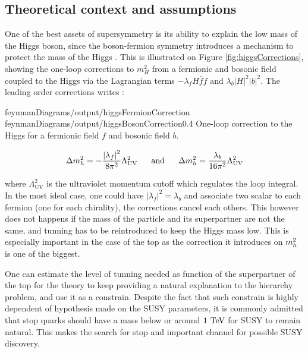         \subsection{Theoretical context and assumptions}

        One of the best assets of supersymmetry is its ability to explain the low mass
        of the Higgs boson, since the boson-fermion symmetry introduces a mechanism to
        protect the mass of the Higgs . This is illustrated on Figure
        \ref{fig:higgsCorrections}, showing the one-loop corrections to $m_H^2$
        from a fermionic and bosonic field coupled to the Higgs via the Lagrangian terms
        $- \lambda_f H \bar{f} f$ and $\lambda_b \left| H \right|^2 \left| b \right|^2$.
        The leading order corrections writes :

        {feynmanDiagrams/output/higgsFermionCorrection}
        {feynmanDiagrams/output/higgsBosonCorrection}{0.4}
        {One-loop correction to the Higgs for a fermionic field $f$ and bosonic field $b$.}

        \begin{equation}
            \Delta m_{h}^2 = - \frac{\left| \lambda_f \right|^2}{8\pi^2} \Lambda^2_{\text{UV}}
            \, \, \, \, \, \, \, \, \, \, \text{and} \, \, \, \, \, \, \, \, \, \,
            \Delta m_{h}^2 =   \frac{\lambda_b}{16\pi^2} \Lambda^2_{\text{UV}}
        \end{equation}

        where $\Lambda^2_{\text{UV}}$ is the ultraviolet momentum cutoff which regulates
        the loop integral. In the most ideal case, one could have $\left| \lambda_f \right|^2
        = \lambda_b$ and associate two scalar to each fermion (one for each chirality), 
        the corrections cancel each others. 
        This however does not happens if the mass of the particle and its superpartner 
        are not the same, and tunning has to be reintroduced to keep the Higgs mass low.
        This is especially important in the case of the top as the correction it introduces
        on $m_{h}^2$ is one of the biggest. 
        
        One can estimate the level of tunning needed as function of the superpartner of
        the top for the theory to keep providing a natural explanation to the hierarchy
        problem, and use it as a constrain. Despite the fact that such constrain is 
        highly dependent of hypothesis made on the SUSY parameters, it is commonly admitted 
        that stop quarks should have a mass below or around $1~\text{TeV}$ for SUSY to remain natural.
        This makes the search for stop and important channel for possible SUSY discovery.

